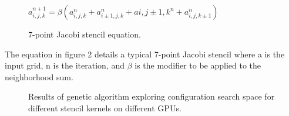 \documentclass[conference]{IEEEtran}
\begin{document}
\begin{figure}[h!]
	\centering
$a_{i,j,k}^{n+1} = \beta(a_{i,j,k}^n + a_{i\pm1,j,k}^n + a{i,j\pm1,k}^n + a_{i,j,k\pm1}^n)$
	\caption{7-point Jacobi stencil equation.}
\end{figure}

	The equation in figure 2 details a typical 7-point Jacobi stencil where a is the input grid, n is the iteration, and $\beta$ is the modifier to be applied to the neighborhood sum.
	
	\begin{figure}[t]
\centering
	\label{fig:sub1}
	\hfill
	\label{fig:sub2}
	\hfill
	\label{fig:sub3}
	\hfill
	\label{fig:sub4}
	\caption{Results of genetic algorithm exploring configuration search space for different stencil kernels on different GPUs.}
\end{figure}
\end{document}
